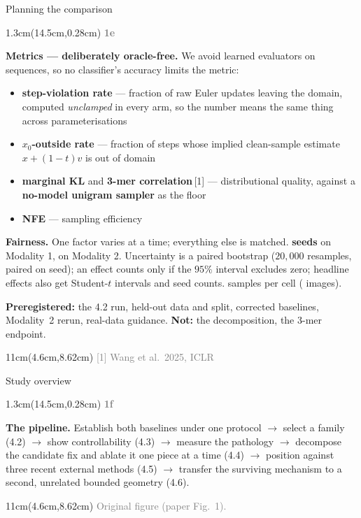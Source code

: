 \documentclass[aspectratio=169,10pt]{beamer}
\newcommand{\lab}[1]{%
  \begin{textblock*}{1.3cm}(14.5cm,0.28cm)
    \raggedleft\bfseries\small\textcolor{gray}{#1}
  \end{textblock*}}
\newcommand{\srcs}[1]{%
  \begin{textblock*}{11cm}(4.6cm,8.62cm)
    \raggedleft\fontsize{4.8}{5.6}\selectfont\textcolor{gray}{#1}
  \end{textblock*}}
\begin{document}
\begin{frame}{Planning the comparison}
\lab{1e}
\textbf{Metrics --- deliberately oracle-free.} We avoid learned evaluators on sequences, so no
classifier's accuracy limits the metric:
\begin{itemize}
\item \textbf{step-violation rate} --- fraction of raw Euler updates leaving the domain,
computed \emph{unclamped} in every arm, so the number means the same thing across
parameterisations
\item \textbf{$x_0$-outside rate} --- fraction of steps whose implied clean-sample estimate
$x + (1-t)v$ is out of domain
\item \textbf{marginal KL} and \textbf{3-mer correlation}\,[1] --- distributional quality,
against a \textbf{no-model unigram sampler} as the floor
\item \textbf{NFE} --- sampling efficiency
\end{itemize}

\textbf{Fairness.} One factor varies at a time; everything else is matched. \textbf{\MOneSeeds{} seeds}
on Modality 1, \MTwoSeeds{} on Modality 2. Uncertainty is a paired bootstrap ($20{,}000$ resamples,
paired on seed); an effect counts only if the $95\%$ interval excludes zero; headline effects also
get Student-$t$ intervals and seed counts. \MOneEval{} samples per cell (\MTwoEval{} images).

\medskip
\textbf{Preregistered:} the 4.2 run, held-out data and split, corrected baselines, Modality~2 rerun,
real-data guidance.
\textbf{Not:} the decomposition, the 3-mer endpoint.
\srcs{[1] Wang et al.\ 2025, ICLR}
\end{frame}

\begin{frame}{Study overview}
\lab{1f}
\begin{center}
\resizebox{0.97\textwidth}{!}{}
\end{center}
\textbf{The pipeline.} Establish both baselines under one protocol $\rightarrow$ select a
family (4.2) $\rightarrow$ show controllability (4.3) $\rightarrow$ measure the pathology
$\rightarrow$ decompose the candidate fix and ablate it one piece at a time (4.4)
$\rightarrow$ position against three recent external methods (4.5) $\rightarrow$ transfer the
surviving mechanism to a second, unrelated bounded geometry (4.6).

\medskip
\srcs{Original figure (paper Fig.~1).}
\end{frame}
\end{document}
